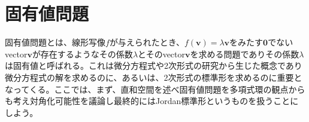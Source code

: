 \documentclass[a4paper]{jsarticle}
\begin{document}
\section{固有値問題}
固有値問題とは、線形写像$f$が与えられたとき、$f(\mathbf{v} )=\lambda \mathbf{v} $をみたす$\mathbf{0}$でないvector$\mathbf{v}$が存在するようなその係数$\lambda$とそのvector$\mathbf{v}$を求める問題でありその係数$\lambda$は固有値と呼ばれる。これは微分方程式や2次形式の研究から生じた概念であり微分方程式の解を求めるのに、あるいは、2次形式の標準形を求めるのに重要となってくる。ここでは、まず、直和空間を述べ固有値問題を多項式環の観点からも考え対角化可能性を議論し最終的にはJordan標準形というものを扱うことにしよう。
\end{document}
